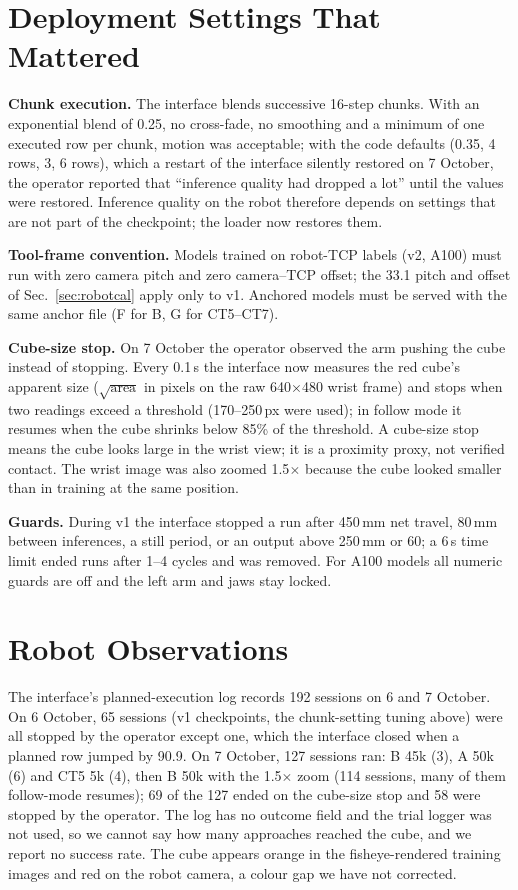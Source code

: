 \documentclass[conference,10pt]{IEEEtran}
\newcommand{\mm}{\,mm\xspace}
\begin{document}
\section{Deployment Settings That Mattered}\label{sec:deploy}
\textbf{Chunk execution.} The interface blends successive 16-step chunks. With an exponential blend of 0.25, no cross-fade, no
smoothing and a minimum of one executed row per chunk, motion was acceptable; with the code defaults (0.35, 4 rows, 3\textdegree,
6 rows), which a restart of the interface silently restored on 7 October, the operator reported that ``inference quality had
dropped a lot'' until the values were restored. Inference quality on the robot therefore depends on settings that are not
part of the checkpoint; the loader now restores them.

\textbf{Tool-frame convention.} Models trained on robot-TCP labels (v2, A100) must run with zero camera pitch and zero
camera--TCP offset; the 33.1\textdegree{} pitch and offset of Sec.~\ref{sec:robotcal} apply only to v1. Anchored models must be
served with the same anchor file (F for B, G for CT5--CT7).

\textbf{Cube-size stop.} On 7 October the operator observed the arm pushing the cube instead of stopping. Every 0.1\,s the
interface now measures the red cube's apparent size ($\sqrt{\text{area}}$ in pixels on the raw 640$\times$480 wrist frame) and
stops when two readings exceed a threshold (170--250\,px were used); in follow mode it resumes when the cube shrinks below 85\%
of the threshold. A cube-size stop means the cube looks large in the wrist view; it is a proximity proxy, not verified contact.
The wrist image was also zoomed 1.5$\times$ because the cube looked smaller than in training at the same position.

\textbf{Guards.} During v1 the interface stopped a run after 450\mm net travel, 80\mm between inferences, a still period, or
an output above 250\mm or 60\textdegree; a 6\,s time limit ended runs after 1--4 cycles and was removed. For A100 models all
numeric guards are off and the left arm and jaws stay locked.

\section{Robot Observations}\label{sec:robot}
The interface's planned-execution log records 192 sessions on 6 and 7 October. On 6 October, 65 sessions (v1 checkpoints, the
chunk-setting tuning above) were all stopped by the operator except one, which the interface closed when a planned row jumped by
90.9\textdegree. On 7 October, 127 sessions ran: B 45k (3), A 50k (6) and CT5 5k (4), then B 50k with the 1.5$\times$ zoom (114
sessions, many of them follow-mode resumes); 69 of the 127 ended on the cube-size stop and 58 were stopped by the operator.
The log has no outcome field and the trial logger was not used, so we cannot say how many approaches reached the cube, and we
report no success rate. The cube appears orange in the fisheye-rendered training images and red on the robot camera, a colour
gap we have not corrected.
\end{document}
